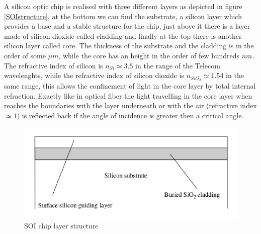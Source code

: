 \documentclass[12pt]{book}
\begin{document}
A silicon optic chip is realised with three different layers as depicted in figure \eqref{SOIstructure}, at the bottom we can find the substrate, a silicon layer which provides a base and a stable structure for the chip, just above it there is a layer made of silicon dioxide called cladding and finally at the top there is another silicon layer called core. The thickness of the substrate and the cladding is in the order of some $\mu m$, while the core has an height in the order of few hundreds $nm$. The refractive index of silicon is $n_{Si} \simeq 3.5$ in the range of the Telecom wavelenghts, while the refractive index of silicon dioxide is $n_{SiO_2}\simeq 1.54$ in the same range, this allows the confinement of light in the core layer by total internal refraction. Exactly like in optical fiber the light travelling in the core layer when reaches the boundaries with the layer underneath or with the air (refractive index $\simeq 1$) is reflected back if the angle of incidence is greater then a critical angle. 
\begin{figure}
\centering
\includegraphics[width = .7\textwidth]{img/SOIstructure}
\caption{SOI chip layer structure}
\label{SOIstructure}
\end{figure}
\end{document}
